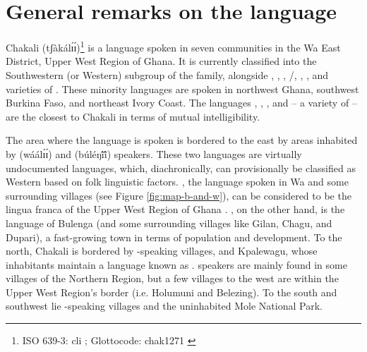 \label{sec:intro}



\chapter{General remarks on the language}
\label{sec:background}

Chakali  ({\sls tʃàkálɪ́ɪ́})\footnote{ISO 639-3: cli  \citep{lewi16}; Glottocode: chak1271 \citep{glot16}} is a language  spoken in seven communities in the Wa East District, Upper West Region of Ghana.   It is currently classified  into the  Southwestern (or Western) subgroup of the  family, alongside , , , /, , , and varieties of  \citep{lewi14, glot16}. These minority languages are spoken in northwest Ghana, southwest Burkina Faso,  and northeast Ivory Coast.  The languages  , , , and   -- a variety of   --  are the closest to Chakali in terms of mutual intelligibility.


The area where the language is spoken  is bordered to the east  by areas inhabited by  ({\sls wáálɪ́ɪ́}) and  ({\sls búléŋĩ́ĩ́}) speakers. These two languages are virtually undocumented languages, which,   diachronically, can provisionally be classified as Western  based on folk linguistic factors. , the language spoken in Wa and some surrounding villages (see Figure \ref{fig:map-b-and-w}), can be considered to be the lingua franca of the Upper West Region of Ghana  \citep{brin15d}. , on the other hand, is the language of Bulenga (and some surrounding villages like Gilan, Chagu, and Dupari), a fast-growing town in terms of population and development. To the north, Chakali is bordered by -speaking villages, and Kpalewagu, whose inhabitants maintain a  language known as .  speakers are mainly found in some villages of the Northern Region, but a few villages to the west are within the Upper West Region's border (i.e. Holumuni and Belezing).  To the south and southwest lie -speaking villages and the uninhabited Mole National Park.


